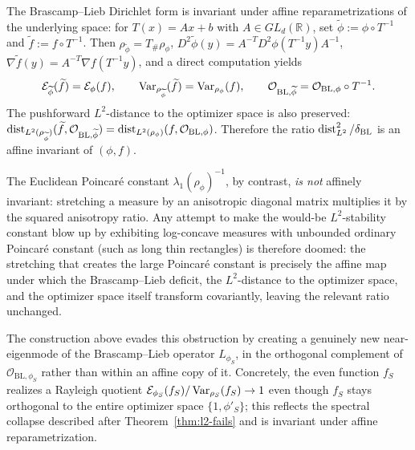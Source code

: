 \begin{remark}\label{rem:affine}
The Brascamp--Lieb Dirichlet form is invariant under affine reparametrizations
of the underlying space: for $T(x)=Ax+b$ with $A\in GL_d(\mathbb R)$, set
$\widetilde\phi:=\phi\circ T^{-1}$ and $\widetilde f:=f\circ T^{-1}$. Then
$\rho_{\widetilde\phi}=T_\#\rho_\phi$, $D^2\widetilde\phi(y)=
A^{-T}D^2\phi(T^{-1}y)A^{-1}$, $\nabla\widetilde f(y)=A^{-T}\nabla f(T^{-1}y)$,
and a direct computation yields
\[
  \mathcal E_{\widetilde\phi}(\widetilde f)=\mathcal E_\phi(f),\qquad
  \operatorname{Var}_{\rho_{\widetilde\phi}}(\widetilde f)=\operatorname{Var}_{\rho_\phi}(f),\qquad
  \mathcal O_{\mathrm{BL},\widetilde\phi}=\mathcal O_{\mathrm{BL},\phi}\circ T^{-1}.
\]
The pushforward $L^2$-distance to the optimizer space is also preserved:
$\operatorname{dist}_{L^2(\rho_{\widetilde\phi})}(\widetilde f,\mathcal O_{\mathrm{BL},
\widetilde\phi})=\operatorname{dist}_{L^2(\rho_\phi)}(f,\mathcal O_{\mathrm{BL},\phi})$.
Therefore the ratio
$\operatorname{dist}_{L^2}^2/\delta_{\mathrm{BL}}$ is an affine invariant of $(\phi,f)$.

The Euclidean Poincar\'e constant $\lambda_1(\rho_\phi)^{-1}$, by contrast,
\emph{is not} affinely invariant: stretching a measure by an anisotropic
diagonal matrix multiplies it by the squared anisotropy ratio. Any attempt to
make the would-be $L^2$-stability constant blow up by exhibiting log-concave
measures with unbounded ordinary Poincar\'e constant (such as long thin
rectangles) is therefore doomed: the stretching that creates the large
Poincar\'e constant is precisely the affine map under which the
Brascamp--Lieb deficit, the $L^2$-distance to the optimizer space, and the
optimizer space itself transform covariantly, leaving the relevant ratio
unchanged.

The construction above evades this obstruction by creating a genuinely new
near-eigenmode of the Brascamp--Lieb operator $L_{\phi_S}$, in the orthogonal
complement of $\mathcal O_{\mathrm{BL},\phi_S}$ rather than within an affine
copy of it. Concretely, the even function $f_S$ realizes a Rayleigh quotient
$\mathcal E_{\phi_S}(f_S)/\operatorname{Var}_{\rho_S}(f_S)\to 1$ even though $f_S$ stays
orthogonal to the entire optimizer space $\{1,\phi'_S\}$; this reflects the
spectral collapse described after Theorem~\ref{thm:l2-fails} and is invariant
under affine reparametrization.
\end{remark}
